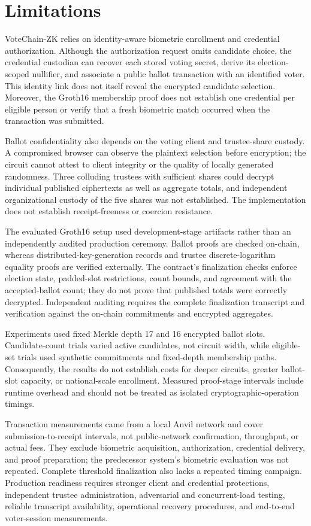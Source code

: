 \section{Limitations}
\label{sec:09}
\label{sec:limitations}

VoteChain-ZK relies on identity-aware biometric enrollment and credential
authorization. Although the authorization request omits candidate choice, the
credential custodian can recover each stored voting secret, derive its
election-scoped nullifier, and associate a public ballot transaction with an
identified voter. This identity link does not itself reveal the encrypted candidate
selection. Moreover, the Groth16 membership proof does not establish one credential
per eligible person or verify that a fresh biometric match occurred when the
transaction was submitted.

Ballot confidentiality also depends on the voting client and trustee-share custody.
A compromised browser can observe the plaintext selection before encryption; the
circuit cannot attest to client integrity or the quality of locally generated
randomness. Three colluding trustees with sufficient shares could decrypt individual
published ciphertexts as well as aggregate totals, and independent organizational
custody of the five shares was not established. The implementation does not
establish receipt-freeness or coercion resistance.

The evaluated Groth16 setup used development-stage artifacts rather than an
independently audited production ceremony. Ballot proofs are checked on-chain,
whereas distributed-key-generation records and trustee discrete-logarithm equality
proofs are verified externally. The contract's finalization checks enforce election
state, padded-slot restrictions, count bounds, and agreement with the
accepted-ballot count; they do not prove that published totals were correctly
decrypted. Independent auditing requires the complete finalization transcript and
verification against the on-chain commitments and encrypted aggregates.

Experiments used fixed Merkle depth 17 and 16 encrypted ballot slots.
Candidate-count trials varied active candidates, not circuit width, while
eligible-set trials used synthetic commitments and fixed-depth membership paths.
Consequently, the results do not establish costs for deeper circuits, greater
ballot-slot capacity, or national-scale enrollment. Measured proof-stage intervals
include runtime overhead and should not be treated as isolated
cryptographic-operation timings.

Transaction measurements came from a local Anvil network and cover
submission-to-receipt intervals, not public-network confirmation, throughput, or
actual fees. They exclude biometric acquisition, authorization, credential delivery,
and proof preparation; the predecessor system's biometric evaluation was not
repeated. Complete threshold finalization also lacks a repeated timing campaign.
Production readiness requires stronger client and credential protections,
independent trustee administration, adversarial and concurrent-load testing,
reliable transcript availability, operational recovery procedures, and end-to-end
voter-session measurements.
